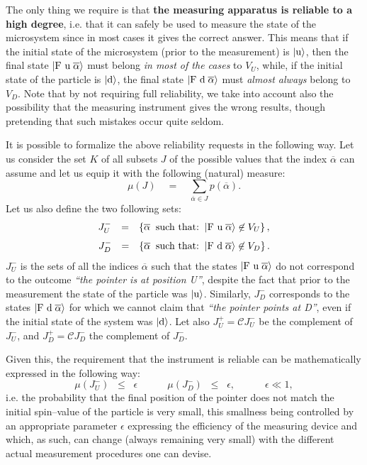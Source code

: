 \documentclass[10pt,a4paper]{article}
\begin{document}
The only thing we require is that {\bf the measuring apparatus is
reliable to a high degree}, i.e. that it can safely be used to
measure the state of the microsystem since in most cases it gives
the correct answer. This means that if the initial state of the
microsystem (prior to the measurement) is $|\makebox{u}\rangle$,
then the final state $|\makebox{F u}\; \overline{\alpha}\rangle$
must belong {\it in most of the cases} to $V_{U}$, while, if the
initial state of the particle is $|\makebox{d}\rangle$, the final
state $|\makebox{F d}\; \overline{\alpha}\rangle$ must {\it almost
always} belong to $V_{D}$. Note that by not requiring full
reliability, we take into account also the possibility that the
measuring  instrument  gives the wrong results, though pretending
that such mistakes occur quite seldom.

It is possible to formalize the above reliability requests in the
following way. Let us consider the set $K$ of all subsets $J$ of
the possible values that the index $\overline{\alpha}$ can assume
and let us equip it with the following (natural) measure:
\[
\mu(J)\quad =\quad \sum_{\overline{\alpha}\in J}
p(\overline{\alpha}).
\]
Let us also define the two following sets:
\[
\begin{array}{lcl}
J^{-}_{U} & = & \left\{\overline{\alpha}\;\; \makebox{such that:}
\;\; |\makebox{F u}\; \overline{\alpha}\rangle \not\in V_{U}
\right\},
\end{array}
\]
\[
\begin{array}{lcl}
J^{-}_{D} & = & \left\{\overline{\alpha}\;\; \makebox{such that:}
\;\; |\makebox{F d}\;\overline{\alpha}\rangle \not\in V_{D}
\right\}.
\end{array}
\]
$J^{-}_{U}$ is the sets of all the indices $\overline{\alpha}$
such that the states $|\makebox{F u}\;\overline{\alpha}\rangle$ do
not correspond to the outcome {\it ``the pointer is at position
U''}, despite the fact that prior to the measurement the state of
the particle was $|\makebox{u} \rangle$. Similarly, $J^{-}_{D}$
corresponds to the states $|\makebox{F d}\; \overline{\alpha}
\rangle$ for which we cannot claim that {\it ``the pointer points
at D''}, even if the initial state of the system was
$|\makebox{d}\rangle$. Let also $J^{+}_{U} = {\mathcal
C}J^{-}_{U}$ be the complement of $J^{-}_{U}$, and $J^{+}_{D} =
{\mathcal C} J^{-}_{D}$ the complement of $J^{-}_{D}$.

Given this, the requirement that the instrument is reliable can be
mathematically expressed in the following way:
\begin{equation} \label{req3}
\mu(J^{-}_{U})\;\; \leq\;\; \epsilon \qquad\quad
\mu(J^{-}_{D})\;\; \leq\;\; \epsilon, \qquad\quad \epsilon \ll 1,
\end{equation}
i.e. the probability that the final position of the pointer does
not match the initial spin--value of the particle is very small,
this smallness being controlled by an appropriate parameter
$\epsilon$ expressing the efficiency of the measuring device and
which, as such, can change (always remaining very small) with the
different actual measurement procedures one can devise.
\end{document}
